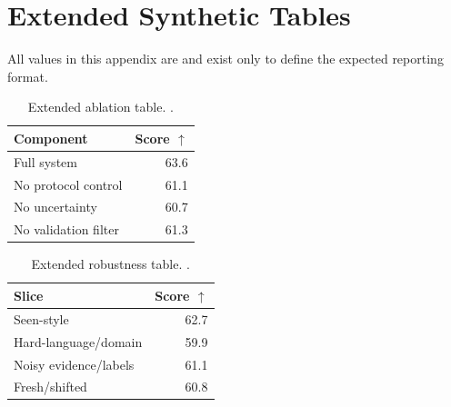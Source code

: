 \section{Extended Synthetic Tables}
    All values in this appendix are \syntheticlabel{} and exist only to define the expected reporting format.

    \begin{table}[t]
    \centering
    \small
    \begin{tabular}{lr}
    \toprule
    Component & Score $\uparrow$ \\
    \midrule
    Full system & 63.6 \\
No protocol control & 61.1 \\
No uncertainty & 60.7 \\
No validation filter & 61.3 \\
    \bottomrule
    \end{tabular}
    \caption{Extended ablation table. \syntheticlabel{}.}
    \end{table}

    \begin{table}[t]
    \centering
    \small
    \begin{tabular}{lr}
    \toprule
    Slice & Score $\uparrow$ \\
    \midrule
    Seen-style & 62.7 \\
Hard-language/domain & 59.9 \\
Noisy evidence/labels & 61.1 \\
Fresh/shifted & 60.8 \\
    \bottomrule
    \end{tabular}
    \caption{Extended robustness table. \syntheticlabel{}.}
    \end{table}
